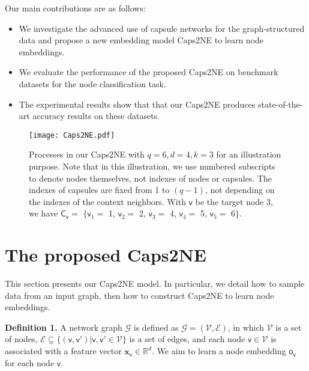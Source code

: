 \documentclass[sigconf]{acmart}
\begin{document}
Our main contributions are as follows:

\begin{itemize}

\item We investigate the advanced use of capsule networks for the graph-structured data and propose a new embedding model Caps2NE to learn node embeddings.

\item We evaluate the performance of the proposed Caps2NE on benchmark datasets for the node classification task.

\item The experimental results show that that our Caps2NE produces state-of-the-art accuracy results on these datasets.

\end{itemize}

\begin{figure*}
\centering
\texttt{[image: Caps2NE.pdf]}
\caption{Processes in our Caps2NE with $q = 6, d = 4, k =3$ for an illustration purpose. {Note that in this illustration, we use numbered subscripts to denote nodes themselves, not indexes of nodes or capsules.} The indexes of capsules are fixed from 1 to $(q-1)$, not depending on the indexes of the context neighbors. With $\mathsf{v}$ be the target node 3, we have $\mathsf{C}_\mathsf{v} =$ $\{\mathsf{v}_1 =$  1, $\mathsf{v}_2 =$  2, $\mathsf{v}_3 =$  4, $\mathsf{v}_4 =$  5, $\mathsf{v}_5 =$ 6$\}$.}
\label{fig:Caps2NE}
\end{figure*}

\section{The proposed Caps2NE}
\label{sec:ourmodel}

This section presents our Caps2NE model. In particular, 
we detail how to sample data from an input graph, then how to construct Caps2NE to learn node embeddings.



\textbf{Definition 1.} A network graph $\mathcal{G}$ is defined as $\mathcal{G} = (\mathcal{V}, \mathcal{E})$, in which $\mathcal{V}$ is a set of nodes, $\mathcal{E} \subseteq \{(\mathsf{v},\mathsf{v'}) | \mathsf{v}, \mathsf{v'} \in \mathcal{V}\}$ is a set of edges, and each node $\mathsf{v} \in \mathcal{V}$ is associated with a feature vector $\boldsymbol{x}_\mathsf{v} \in \mathbb{R}^{d}$.
We aim to learn a node embedding $\boldsymbol{\mathsf{o}}_\mathsf{v}$ for each node $\mathsf{v}$.
\end{document}
